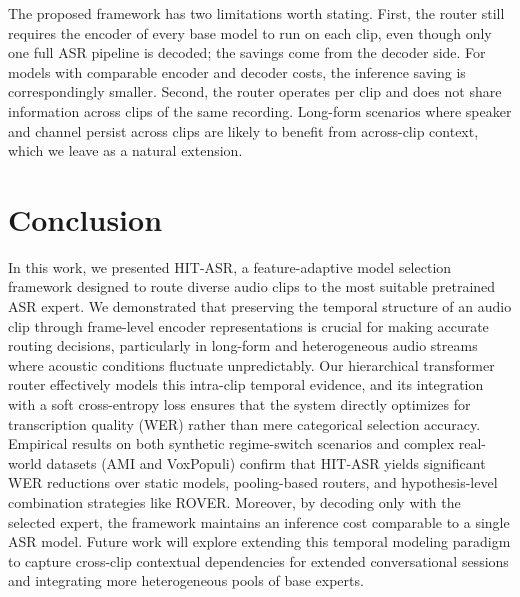 \documentclass[journal]{IEEEtran}
\begin{document}
The proposed framework has two limitations worth stating. First, the
router still requires the encoder of every base model to run on each
clip, even though only one full ASR pipeline is decoded; the savings
come from the decoder side. For models with comparable encoder and
decoder costs, the inference saving is correspondingly smaller.
Second, the router operates per clip and does not share information
across clips of the same recording. Long-form scenarios where speaker
and channel persist across clips are likely to benefit from
across-clip context, which we leave as a natural extension.

\section{Conclusion}
\label{sec:conclusion}

In this work, we presented HIT-ASR, a feature-adaptive model selection framework designed to route diverse audio clips to the most suitable pretrained ASR expert. We demonstrated that preserving the temporal structure of an audio clip through frame-level encoder representations is crucial for making accurate routing decisions, particularly in long-form and heterogeneous audio streams where acoustic conditions fluctuate unpredictably. Our hierarchical transformer router effectively models this intra-clip temporal evidence, and its integration with a soft cross-entropy loss ensures that the system directly optimizes for transcription quality (WER) rather than mere categorical selection accuracy. Empirical results on both synthetic regime-switch scenarios and complex real-world datasets (AMI and VoxPopuli) confirm that HIT-ASR yields significant WER reductions over static models, pooling-based routers, and hypothesis-level combination strategies like ROVER. Moreover, by decoding only with the selected expert, the framework maintains an inference cost comparable to a single ASR model. Future work will explore extending this temporal modeling paradigm to capture cross-clip contextual dependencies for extended conversational sessions and integrating more heterogeneous pools of base experts.



\end{document}
